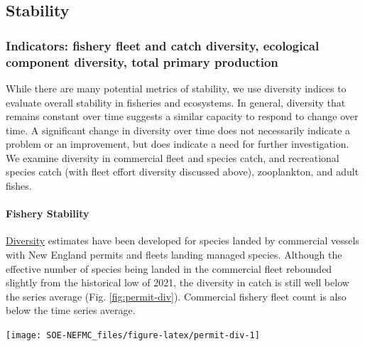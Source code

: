 \documentclass[
  10pt,
]{article}
\let\origfigure\figure
\let\endorigfigure\endfigure
\renewenvironment{figure}[1][2] {
    \expandafter\origfigure\expandafter[H]
} {
    \endorigfigure
}
\begin{document}
\hypertarget{stability}{%
\subsection{Stability}\label{stability}}

\hypertarget{indicators-fishery-fleet-and-catch-diversity-ecological-component-diversity-total-primary-production}{%
\subsubsection{Indicators: fishery fleet and catch diversity, ecological component diversity, total primary production}\label{indicators-fishery-fleet-and-catch-diversity-ecological-component-diversity-total-primary-production}}

While there are many potential metrics of stability, we use diversity indices to evaluate overall stability in fisheries and ecosystems. In general, diversity that remains constant over time suggests a similar capacity to respond to change over time. A significant change in diversity over time does not necessarily indicate a problem or an improvement, but does indicate a need for further investigation. We examine diversity in commercial fleet and species catch, and recreational species catch (with fleet effort diversity discussed above), zooplankton, and adult fishes.

\hypertarget{fishery-stability}{%
\paragraph{Fishery Stability}\label{fishery-stability}}

\href{https://noaa-edab.github.io/catalog/commercial_div.html}{Diversity} estimates have been developed for species landed by commercial vessels with New England permits and fleets landing managed species. Although the effective number of species being landed in the commercial fleet rebounded slightly from the historical low of 2021, the diversity in catch is still well below the series average (Fig. \ref{fig:permit-div}). Commercial fishery fleet count is also below the time series average.

\begin{figure}

{\centering \texttt{[image: SOE-NEFMC\_files/figure-latex/permit-div-1]} 

}

\caption{Species revenue diversity in New England.}\label{fig:permit-div}
\end{figure}
\end{document}
